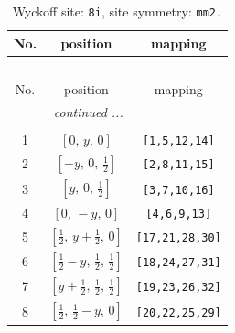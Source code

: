 \documentclass[fleqn,8pt]{jsarticle}
\begin{document}
\begin{longtable}{ccc}
\caption{Wyckoff site: {\tt 8i}, site symmetry: {\tt mm2.}}
 \\
 \hline \hline
No. & position & mapping \\ \hline \endfirsthead

\multicolumn{2}{l}{\tablename\ \thetable{}} \\
 \hline \hline
No. & position & mapping \\ \hline \endhead

 \hline \hline
\multicolumn{2}{r}{\footnotesize\it continued ...} \\ \endfoot

 \hline \hline
\multicolumn{2}{r}{} \\ \endlastfoot

1 & $\left[ 0,\, y,\, 0 \right]$ & {\tt [1,5,12,14]} \\ \hline
2 & $\left[ - y,\, 0,\, \frac{1}{2} \right]$ & {\tt [2,8,11,15]} \\ \hline
3 & $\left[ y,\, 0,\, \frac{1}{2} \right]$ & {\tt [3,7,10,16]} \\ \hline
4 & $\left[ 0,\, - y,\, 0 \right]$ & {\tt [4,6,9,13]} \\ \hline
5 & $\left[ \frac{1}{2},\, y + \frac{1}{2},\, 0 \right]$ & {\tt [17,21,28,30]} \\ \hline
6 & $\left[ \frac{1}{2} - y,\, \frac{1}{2},\, \frac{1}{2} \right]$ & {\tt [18,24,27,31]} \\ \hline
7 & $\left[ y + \frac{1}{2},\, \frac{1}{2},\, \frac{1}{2} \right]$ & {\tt [19,23,26,32]} \\ \hline
8 & $\left[ \frac{1}{2},\, \frac{1}{2} - y,\, 0 \right]$ & {\tt [20,22,25,29]} \\
\end{longtable}
\renewcommand{\arraystretch}{1.2}
\end{document}
